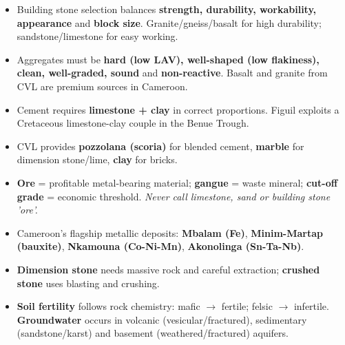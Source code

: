 \documentclass[11pt]{article}
\begin{document}
\begin{aretenir}
\begin{itemize}
    \item Building stone selection balances \textbf{strength, durability, workability, appearance} and \textbf{block size}. Granite/gneiss/basalt for high durability; sandstone/limestone for easy working.
    \item Aggregates must be \textbf{hard (low LAV), well-shaped (low flakiness), clean, well-graded, sound} and \textbf{non-reactive}. Basalt and granite from CVL are premium sources in Cameroon.
    \item Cement requires \textbf{limestone + clay} in correct proportions. Figuil exploits a Cretaceous limestone-clay couple in the Benue Trough.
    \item CVL provides \textbf{pozzolana (scoria)} for blended cement, \textbf{marble} for dimension stone/lime, \textbf{clay} for bricks.
    \item \textbf{Ore} = profitable metal-bearing material; \textbf{gangue} = waste mineral; \textbf{cut-off grade} = economic threshold. \emph{Never call limestone, sand or building stone 'ore'.}
    \item Cameroon's flagship metallic deposits: \textbf{Mbalam (Fe)}, \textbf{Minim-Martap (bauxite)}, \textbf{Nkamouna (Co-Ni-Mn)}, \textbf{Akonolinga (Sn-Ta-Nb)}.
    \item \textbf{Dimension stone} needs massive rock and careful extraction; \textbf{crushed stone} uses blasting and crushing.
    \item \textbf{Soil fertility} follows rock chemistry: mafic $\to$ fertile; felsic $\to$ infertile. \textbf{Groundwater} occurs in volcanic (vesicular/fractured), sedimentary (sandstone/karst) and basement (weathered/fractured) aquifers.
\end{itemize}
\end{aretenir}
\end{document}
